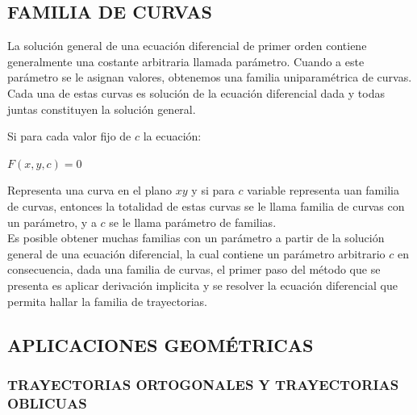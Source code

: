 \documentclass[12pt,letterpaper]{article}
\begin{document}
\begin{titlepage}
\subsection{FAMILIA DE CURVAS}
\begin{flushleft}


La solución general de una ecuación diferencial de primer orden contiene generalmente una costante arbitraria llamada parámetro. Cuando a este parámetro se le asignan valores, obtenemos una familia uniparamétrica de curvas. Cada una de estas curvas es solución de la ecuación diferencial dada y todas juntas constituyen la solución general.

\vspace{0.5cm}
Si para cada valor fijo de $ c $ la ecuación:

\vspace{0.3cm}
\centering
$F(x, y, c) = 0$
\vspace{0.5 cm}

\end{flushleft}

\begin{flushleft}
Representa una curva en el plano $xy$ y si para $c$ variable representa uan familia de curvas, entonces la totalidad de estas curvas se le llama familia de curvas con un parámetro, y a $c$  se le llama parámetro de familias. \\
    
Es posible obtener muchas familias con un parámetro a partir de la solución general de una ecuación diferencial, la cual contiene un parámetro arbitrario $c$ en consecuencia, dada una familia de curvas, el primer paso del método que se presenta es aplicar derivación implicita y se resolver la ecuación diferencial que permita hallar la familia de trayectorias.

\end{flushleft}
\vspace{0.3 cm}
\subsection{APLICACIONES GEOMÉTRICAS}
\vspace{0.1cm}
\subsubsection{TRAYECTORIAS ORTOGONALES Y TRAYECTORIAS OBLICUAS}

\begin{flushleft}


\end{flushleft}
\end{titlepage}
\end{document}
